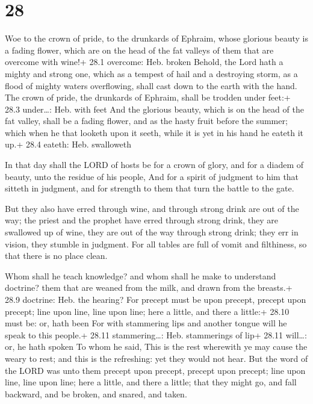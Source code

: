 \hypertarget{section-27}{%
\section{28}\label{section-27}}

 Woe to the crown of pride, to the drunkards of Ephraim,
whose glorious beauty is a fading flower, which are on the head of the
fat valleys of them that are overcome with wine!+ 28.1 overcome: Heb.
broken  Behold, the Lord hath a mighty and strong one, which
as a tempest of hail and a destroying storm, as a flood of mighty waters
overflowing, shall cast down to the earth with the hand. 
The crown of pride, the drunkards of Ephraim, shall be trodden under
feet:+ 28.3 under\ldots: Heb. with feet  And the glorious
beauty, which is on the head of the fat valley, shall be a fading
flower, and as the hasty fruit before the summer; which when he that
looketh upon it seeth, while it is yet in his hand he eateth it up.+
28.4 eateth: Heb. swalloweth

 In that day shall the LORD of hosts be for a crown of
glory, and for a diadem of beauty, unto the residue of his people,
 And for a spirit of judgment to him that sitteth in
judgment, and for strength to them that turn the battle to the gate.

 But they also have erred through wine, and through strong
drink are out of the way; the priest and the prophet have erred through
strong drink, they are swallowed up of wine, they are out of the way
through strong drink; they err in vision, they stumble in judgment.
 For all tables are full of vomit and filthiness, so that
there is no place clean.

 Whom shall he teach knowledge? and whom shall he make to
understand doctrine? them that are weaned from the milk, and drawn from
the breasts.+ 28.9 doctrine: Heb. the hearing?  For precept
must be upon precept, precept upon precept; line upon line, line upon
line; here a little, and there a little:+ 28.10 must be: or, hath been
 For with stammering lips and another tongue will he speak
to this people.+ 28.11 stammering\ldots: Heb. stammerings of lip+ 28.11
will\ldots: or, he hath spoken  To whom he said, This is
the rest wherewith ye may cause the weary to rest; and this is the
refreshing: yet they would not hear.  But the word of the
LORD was unto them precept upon precept, precept upon precept; line upon
line, line upon line; here a little, and there a little; that they might
go, and fall backward, and be broken, and snared, and taken.

